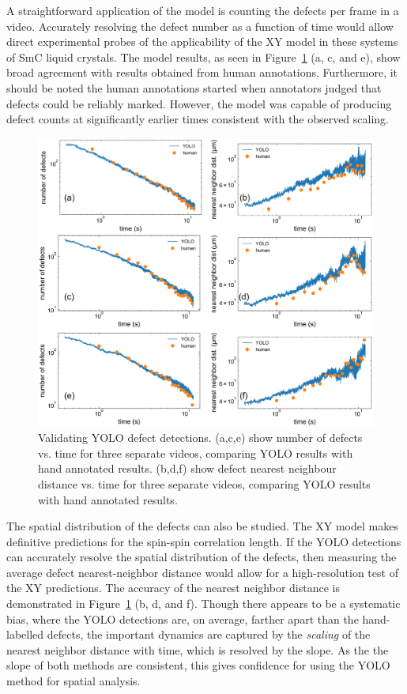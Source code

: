 \documentclass[twoside,twocolumn,9pt]{article}
\begin{document}
A straightforward application of the model is counting the defects per frame in a video. Accurately resolving the defect number as a function of time would allow direct experimental probes of the applicability of the XY model in these systems of SmC liquid crystals. The model results, as seen in Figure~\ref{fig:HumanVMachine} (a, c, and e), show broad agreement with results obtained from human annotations. Furthermore, it should be noted the human annotations started when annotators judged that defects could be reliably marked. However, the model was capable of producing defect counts at significantly earlier times consistent with the observed scaling.
\begin{figure}[h!]
\centering
  \includegraphics[width=.8\textwidth]{humanVmachineAllR.png}
  \caption{Validating YOLO defect detections. (a,c,e) show number of defects vs. time for three separate videos, comparing YOLO results with hand annotated results. (b,d,f) show defect nearest neighbour distance vs. time for three separate videos, comparing YOLO results with hand annotated results.}
  \label{fig:HumanVMachine}
\end{figure}

The spatial distribution of the defects can also be studied. The XY model makes definitive predictions for the spin-spin correlation length\cite{yurke_coarsening_1993}. If the YOLO detections can accurately resolve the spatial distribution of the defects, then measuring the average defect nearest-neighbor distance would allow for a high-resolution test of the XY predictions. The accuracy of the nearest neighbor distance is demonstrated in  Figure~\ref{fig:HumanVMachine} (b, d, and f). Though there appears to be a systematic bias, where the YOLO detections are, on average, farther apart than the hand-labelled defects, the important dynamics are captured by the \textit{scaling} of the nearest neighbor distance with time, which is resolved by the slope. As the the slope of both methods are consistent, this gives confidence for using the YOLO method for spatial analysis.
\end{document}
